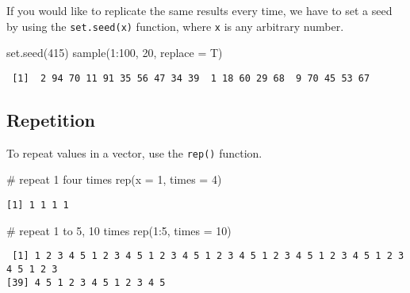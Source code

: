 \documentclass[
  letterpaper,
  DIV=11,
  numbers=noendperiod]{scrreprt}
\newenvironment{Shaded}{\begin{snugshade}}{\end{snugshade}}
\newcommand{\AttributeTok}[1]{\textcolor[rgb]{0.40,0.45,0.13}{#1}}
\newcommand{\CommentTok}[1]{\textcolor[rgb]{0.37,0.37,0.37}{#1}}
\newcommand{\DecValTok}[1]{\textcolor[rgb]{0.68,0.00,0.00}{#1}}
\newcommand{\FunctionTok}[1]{\textcolor[rgb]{0.28,0.35,0.67}{#1}}
\newcommand{\NormalTok}[1]{\textcolor[rgb]{0.00,0.23,0.31}{#1}}
\newcommand{\SpecialCharTok}[1]{\textcolor[rgb]{0.37,0.37,0.37}{#1}}
\begin{document}
If you would like to replicate the same results every time, we have to
set a seed by using the \texttt{set.seed(x)} function, where \texttt{x}
is any arbitrary number.

\begin{Shaded}
\begin{Highlighting}[]
\FunctionTok{set.seed}\NormalTok{(}\DecValTok{415}\NormalTok{)}
\FunctionTok{sample}\NormalTok{(}\DecValTok{1}\SpecialCharTok{:}\DecValTok{100}\NormalTok{, }\DecValTok{20}\NormalTok{, }\AttributeTok{replace =}\NormalTok{ T)}
\end{Highlighting}
\end{Shaded}

\begin{verbatim}
 [1]  2 94 70 11 91 35 56 47 34 39  1 18 60 29 68  9 70 45 53 67
\end{verbatim}

\subsection*{Repetition}\label{repetition}

To repeat values in a vector, use the \texttt{rep()} function.

\begin{Shaded}
\begin{Highlighting}[]
\CommentTok{\# repeat 1 four times }
\FunctionTok{rep}\NormalTok{(}\AttributeTok{x =} \DecValTok{1}\NormalTok{, }\AttributeTok{times =} \DecValTok{4}\NormalTok{)}
\end{Highlighting}
\end{Shaded}

\begin{verbatim}
[1] 1 1 1 1
\end{verbatim}

\begin{Shaded}
\begin{Highlighting}[]
\CommentTok{\# repeat 1 to 5, 10 times}
\FunctionTok{rep}\NormalTok{(}\DecValTok{1}\SpecialCharTok{:}\DecValTok{5}\NormalTok{, }\AttributeTok{times =} \DecValTok{10}\NormalTok{)}
\end{Highlighting}
\end{Shaded}

\begin{verbatim}
 [1] 1 2 3 4 5 1 2 3 4 5 1 2 3 4 5 1 2 3 4 5 1 2 3 4 5 1 2 3 4 5 1 2 3 4 5 1 2 3
[39] 4 5 1 2 3 4 5 1 2 3 4 5
\end{verbatim}
\end{document}
